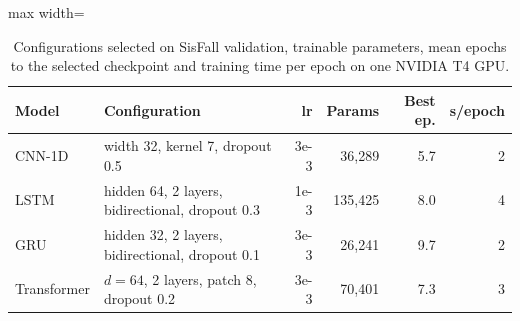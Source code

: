 \begin{table}[ht]
\centering
\small
\caption{Configurations selected on SisFall validation, trainable parameters, mean epochs to the selected checkpoint and training time per epoch on one NVIDIA T4 GPU.}
\label{tab:hparams}
\begin{adjustbox}{max width=\textwidth}
\begin{tabular}{lp{6.3cm}rrrr}
\toprule
Model & Configuration & lr & Params & Best ep. & s/epoch \\
\midrule
CNN-1D & width 32, kernel 7, dropout 0.5 & 3e-3 & 36,289 & 5.7 & 2 \\
LSTM & hidden 64, 2 layers, bidirectional, dropout 0.3 & 1e-3 & 135,425 & 8.0 & 4 \\
GRU & hidden 32, 2 layers, bidirectional, dropout 0.1 & 3e-3 & 26,241 & 9.7 & 2 \\
Transformer & $d=64$, 2 layers, patch 8, dropout 0.2 & 3e-3 & 70,401 & 7.3 & 3 \\
\bottomrule
\end{tabular}
\end{adjustbox}
\end{table}